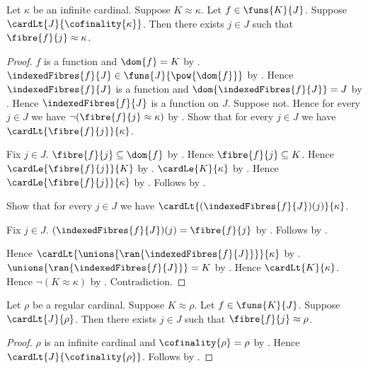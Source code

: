 \begin{theorem}\label{large_fibre_below_cofinality}
    Let $\kappa$ be an infinite cardinal.
    Suppose $K\approx\kappa$.
    Let $f\in\funs{K}{J}$.
    Suppose $\cardLt{J}{\cofinality{\kappa}}$.
    Then there exists $j\in J$ such that
        $\fibre{f}{j}\approx\kappa$.
\end{theorem}
\begin{proof}
    $f$ is a function and $\dom{f}=K$ by
        .
    $\indexedFibres{f}{J}\in\funs{J}{\pow{\dom{f}}}$ by
        .
    Hence $\indexedFibres{f}{J}$ is a function and
        $\dom{\indexedFibres{f}{J}}=J$ by
        .
    Hence $\indexedFibres{f}{J}$ is a function on $J$.
    Suppose not.
    Hence for every $j\in J$ we have
        $\lnot(\fibre{f}{j}\approx\kappa)$ by \auto.
    Show that for every $j\in J$ we have
        $\cardLt{\fibre{f}{j}}{\kappa}$.
    \begin{subproof}
        Fix $j\in J$.
        $\fibre{f}{j}\subseteq\dom{f}$ by
            .
        Hence $\fibre{f}{j}\subseteq K$.
        Hence $\cardLe{\fibre{f}{j}}{K}$ by
            .
        $\cardLe{K}{\kappa}$ by .
        Hence $\cardLe{\fibre{f}{j}}{\kappa}$ by
            .
        Follows by .
    \end{subproof}
    Show that for every $j\in J$ we have
        $\cardLt{(\indexedFibres{f}{J})(j)}{\kappa}$.
    \begin{subproof}
        Fix $j\in J$.
        $(\indexedFibres{f}{J})(j)=\fibre{f}{j}$ by
            .
        Follows by \auto.
    \end{subproof}
    Hence $\cardLt{\unions{\ran{\indexedFibres{f}{J}}}}{\kappa}$ by
        .
    $\unions{\ran{\indexedFibres{f}{J}}}=K$ by
        .
    Hence $\cardLt{K}{\kappa}$.
    Hence $\lnot(K\approx\kappa)$ by .
    Contradiction.
\end{proof}

\begin{corollary}\label{regular_large_fibre}
    Let $\rho$ be a regular cardinal.
    Suppose $K\approx\rho$.
    Let $f\in\funs{K}{J}$.
    Suppose $\cardLt{J}{\rho}$.
    Then there exists $j\in J$ such that
        $\fibre{f}{j}\approx\rho$.
\end{corollary}
\begin{proof}
    $\rho$ is an infinite cardinal and
        $\cofinality{\rho}=\rho$ by .
    Hence $\cardLt{J}{\cofinality{\rho}}$.
    Follows by .
\end{proof}
